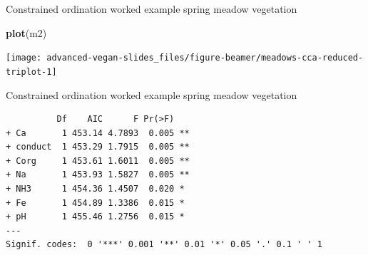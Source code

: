 \documentclass[10pt,ignorenonframetext,compress, aspectratio=169]{beamer}
\newenvironment{Shaded}{\begin{snugshade}}{\end{snugshade}}
\newcommand{\KeywordTok}[1]{\textcolor[rgb]{0.13,0.29,0.53}{\textbf{{#1}}}}
\newcommand{\NormalTok}[1]{{#1}}
\begin{document}
\begin{frame}[fragile]{Constrained ordination worked example \textbar{}
spring meadow vegetation}

\scriptsize

\begin{Shaded}
\begin{Highlighting}[]
\KeywordTok{plot}\NormalTok{(m2)}
\end{Highlighting}
\end{Shaded}

\begin{center}\texttt{[image: advanced-vegan-slides\_files/figure-beamer/meadows-cca-reduced-triplot-1]} \end{center}

\normalsize

\end{frame}

\begin{frame}[fragile]{Constrained ordination worked example \textbar{}
spring meadow vegetation}

\scriptsize

\begin{Shaded}
\end{Shaded}

\begin{verbatim}
          Df    AIC      F Pr(>F)   
+ Ca       1 453.14 4.7893  0.005 **
+ conduct  1 453.29 1.7915  0.005 **
+ Corg     1 453.61 1.6011  0.005 **
+ Na       1 453.93 1.5827  0.005 **
+ NH3      1 454.36 1.4507  0.020 * 
+ Fe       1 454.89 1.3386  0.015 * 
+ pH       1 455.46 1.2756  0.015 * 
---
Signif. codes:  0 '***' 0.001 '**' 0.01 '*' 0.05 '.' 0.1 ' ' 1
\end{verbatim}

\normalsize

\end{frame}
\end{document}
